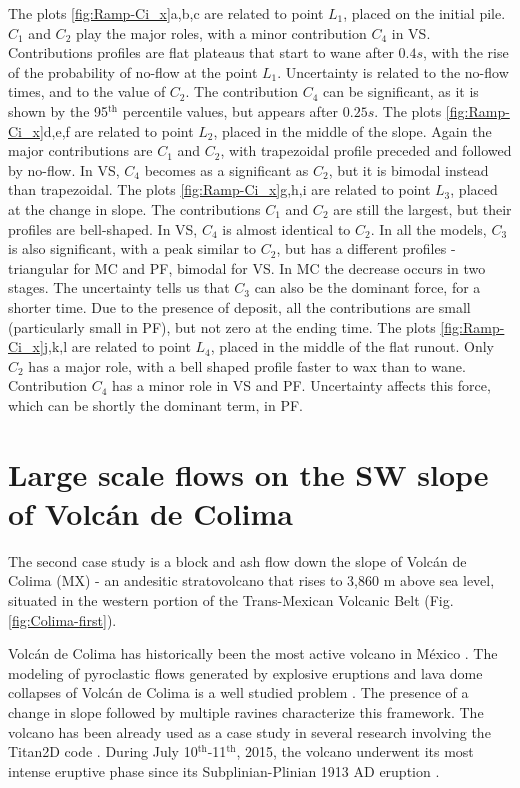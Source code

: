 \documentclass{article}
\begin{document}
The plots \ref{fig:Ramp-Ci_x}a,b,c are related to point $L_1$, placed on the initial pile. $C_1$ and $C_2$ play the major roles, with a minor contribution $C_4$ in VS. Contributions profiles are flat plateaus that start to wane after $0.4 s$, with the rise of the probability of no-flow at the point $L_1$. Uncertainty is related to the no-flow times, and to the value of $C_2$. The contribution $C_4$ can be significant, as it is shown by the 95$^{\mathrm{th}}$ percentile values, but appears after $0.25 s$. The plots \ref{fig:Ramp-Ci_x}d,e,f are related to point $L_2$, placed in the middle of the slope. Again the major contributions are $C_1$ and $C_2$, with trapezoidal profile preceded and followed by no-flow. In VS, $C_4$ becomes as a significant as $C_2$, but it is bimodal instead than trapezoidal. The plots \ref{fig:Ramp-Ci_x}g,h,i are related to point $L_3$, placed at the change in slope. The contributions $C_1$ and $C_2$ are still the largest, but their profiles are bell-shaped. In VS, $C_4$ is almost identical to $C_2$. In all the models, $C_3$ is also significant, with a peak similar to $C_2$, but has a different profiles - triangular for MC and PF, bimodal for VS. In MC the decrease occurs in two stages. The uncertainty tells us that $C_3$ can also be the dominant force, for a shorter time. Due to the presence of deposit, all the contributions are small (particularly small in PF), but not zero at the ending time. The plots \ref{fig:Ramp-Ci_x}j,k,l are related to point $L_4$, placed in the middle of the flat runout. Only $C_2$ has a major role, with a bell shaped profile faster to wax than to wane. Contribution $C_4$ has a minor role in VS and PF. Uncertainty affects this force, which can be shortly the dominant term, in PF.

\section{Large scale flows on the SW slope of Volc{\'a}n de Colima}\label{QoI2}
The second case study is a block and ash flow down the slope of Volc{\'a}n de Colima (MX) - an andesitic stratovolcano that rises to 3,860 m above sea level, situated in the western portion of the Trans-Mexican Volcanic Belt (Fig. \ref{fig:Colima-first}).

Volc{\'a}n de Colima has historically been the most active volcano in M{\'e}xico \citep{DeLaCruzReina1993, Zobin2002, Gonzalez2002}. The modeling of pyroclastic flows generated by explosive eruptions and lava dome collapses of Volc{\'a}n de Colima is a well studied problem \citep{DelPozzo1995,Sheridan1995,Saucedo2002,Saucedo2004,Saucedo2005,Sarocchi2011,Capra2015}. The presence of a change in slope followed by multiple ravines characterize this framework. The volcano has been already used as a case study in several research involving the Titan2D code \citep{Rupp2004, Rupp2006, Dalbey2008, Yu2009, Sulpizio2010, Capra2011, Aghakhani2016}. During July 10$^{\mathrm{th}}$-11$^{\mathrm{th}}$, 2015, the volcano underwent its most intense eruptive phase since its Subplinian-Plinian 1913 AD eruption \citep{Saucedo2010, Zobin2015, ReyesDaVilla2016, Capra2016, Macorps2017}.
\end{document}
